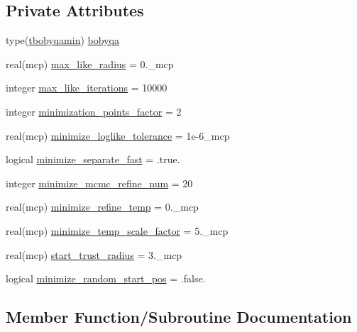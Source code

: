 \subsection*{Private Attributes}
\begin{DoxyCompactItemize}
\item 
type(\mbox{\hyperlink{structminimize_1_1tbobyqamin}{tbobyqamin}}) \mbox{\hyperlink{structminimize_1_1tpowellminimizer_a92246f595ce268aecee1f34b492293d0}{bobyqa}}
\item 
real(mcp) \mbox{\hyperlink{structminimize_1_1tpowellminimizer_ad81827f7e9e0d9ef2fff1c9be6907efa}{max\+\_\+like\+\_\+radius}} = 0.\+\_\+mcp
\item 
integer \mbox{\hyperlink{structminimize_1_1tpowellminimizer_a93781ee274ac74f430f21a4f504da2ad}{max\+\_\+like\+\_\+iterations}} = 10000
\item 
integer \mbox{\hyperlink{structminimize_1_1tpowellminimizer_a5b15717da8aeb917e89914aa656ec4c9}{minimization\+\_\+points\+\_\+factor}} = 2
\item 
real(mcp) \mbox{\hyperlink{structminimize_1_1tpowellminimizer_a58aa90209171aa080f91f1b2166d8b0f}{minimize\+\_\+loglike\+\_\+tolerance}} = 1e-\/6\+\_\+mcp
\item 
logical \mbox{\hyperlink{structminimize_1_1tpowellminimizer_a4b48492d67c9cad493fd0d35e7307b87}{minimize\+\_\+separate\+\_\+fast}} = .true.
\item 
integer \mbox{\hyperlink{structminimize_1_1tpowellminimizer_ab9bcf2dc457f9544a7494d277c7a3c06}{minimize\+\_\+mcmc\+\_\+refine\+\_\+num}} = 20
\item 
real(mcp) \mbox{\hyperlink{structminimize_1_1tpowellminimizer_a796a02a9030fc574c5fc584533eb173c}{minimize\+\_\+refine\+\_\+temp}} = 0.\+\_\+mcp
\item 
real(mcp) \mbox{\hyperlink{structminimize_1_1tpowellminimizer_a3c8af0ddc4cef9ba411d56cd99adb5f6}{minimize\+\_\+temp\+\_\+scale\+\_\+factor}} = 5.\+\_\+mcp
\item 
real(mcp) \mbox{\hyperlink{structminimize_1_1tpowellminimizer_a8f50bf0b17a2543ab12aa1bcd4fd89db}{start\+\_\+trust\+\_\+radius}} = 3.\+\_\+mcp
\item 
logical \mbox{\hyperlink{structminimize_1_1tpowellminimizer_a76e15252f9c6a3db6c02fcceec9a30da}{minimize\+\_\+random\+\_\+start\+\_\+pos}} = .false.
\end{DoxyCompactItemize}


\subsection{Member Function/\+Subroutine Documentation}
\mbox{\label{structminimize_1_1tpowellminimizer_aaf3650d665c4070ddc0177ed35b7efb9}} 
